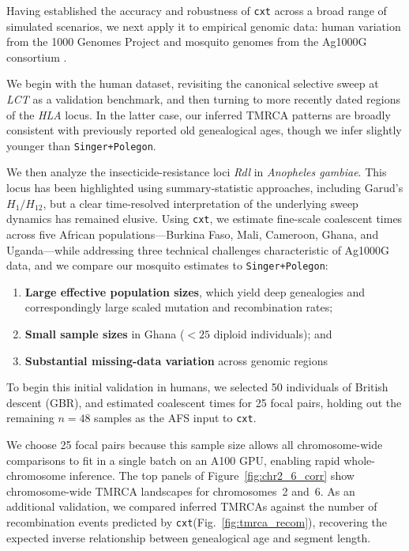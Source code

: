 \documentclass{article}
\newcommand{\cxtkit}{\texttt{cxt}\xspace}
\let\citep\parencite
\begin{document}
Having established the accuracy and robustness of \cxtkit across a broad range of simulated scenarios, 
we next apply it to empirical genomic data: human variation from the 1000 Genomes Project \citep{10002010map} and mosquito genomes from the Ag1000G consortium \citep{anopheles2017genetic}.

We begin with the human dataset, 
revisiting the canonical selective sweep at \emph{LCT} as a validation benchmark,
and then turning to more recently dated regions of the \emph{HLA} locus.
In the latter case,
our inferred TMRCA patterns are broadly consistent with previously reported old genealogical ages,
though we infer slightly younger than \texttt{Singer+Polegon}. 

We then analyze the insecticide-resistance loci \emph{Rdl} in \textit{Anopheles gambiae}. 
This locus has been highlighted using summary‐statistic approaches,
including Garud’s $H_1/H_{12}$,
but a clear time-resolved interpretation of the underlying sweep dynamics has remained elusive. 
Using \cxtkit, we estimate fine-scale coalescent times across five African populations---Burkina Faso, Mali, Cameroon, Ghana, and Uganda---while addressing three technical challenges characteristic of Ag1000G data, and we compare our mosquito estimates to \texttt{Singer+Polegon}:

\begin{enumerate}
    \item \textbf{Large effective population sizes}, which yield deep genealogies and correspondingly large scaled mutation and recombination rates;
    \item \textbf{Small sample sizes} in Ghana (\(<25\) diploid individuals); and
    \item \textbf{Substantial missing-data variation} across genomic regions
\end{enumerate}


To begin this initial validation in humans, 
we selected 50 individuals of British descent (GBR), 
and estimated coalescent times for 25 focal pairs, 
holding out the remaining $n=48$ samples as the AFS input to \cxtkit. 


We choose 25 focal pairs 
because this sample size allows all chromosome-wide comparisons to fit in a single batch on an A100 GPU,
enabling rapid whole-chromosome inference. 
The top panels of Figure~\ref{fig:chr2_6_corr} 
show chromosome-wide TMRCA landscapes for chromosomes~2 and~6. 
As an additional validation, 
we compared inferred TMRCAs against the number of recombination events predicted by \cxtkit (Fig.~\ref{fig:tmrca_recom}),
recovering the expected inverse relationship between genealogical age and segment length.
\end{document}
